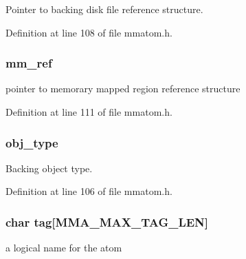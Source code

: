 Pointer to backing disk file reference structure. 



Definition at line 108 of file mmatom.\-h.

\hypertarget{struct_m_m_a___h_a_n_d_l_e_aeda9825879900d8dab7aeb2590edec58}{
\subsubsection[{mm\-\_\-ref}]{ mm\-\_\-ref}}\label{struct_m_m_a___h_a_n_d_l_e_aeda9825879900d8dab7aeb2590edec58}


pointer to memorary mapped region reference structure 



Definition at line 111 of file mmatom.\-h.

\hypertarget{struct_m_m_a___h_a_n_d_l_e_a26e09b58edb668f1bafef07fd59ed8d1}{
\subsubsection[{obj\-\_\-type}]{ obj\-\_\-type}}\label{struct_m_m_a___h_a_n_d_l_e_a26e09b58edb668f1bafef07fd59ed8d1}


Backing object type. 



Definition at line 106 of file mmatom.\-h.

\hypertarget{struct_m_m_a___h_a_n_d_l_e_a83833ee55452b10d5fa6c7daa0295cd0}{
\subsubsection[{tag}]{\setlength{\rightskip}{0pt plus 5cm}char tag\mbox{[}{\bf M\-M\-A\-\_\-\-M\-A\-X\-\_\-\-T\-A\-G\-\_\-\-L\-E\-N}\mbox{]}}}\label{struct_m_m_a___h_a_n_d_l_e_a83833ee55452b10d5fa6c7daa0295cd0}


a logical name for the atom 




